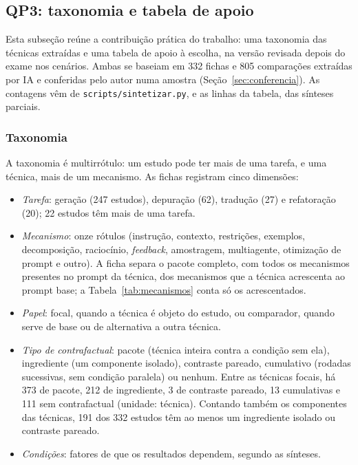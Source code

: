 \subsection{QP3: taxonomia e tabela de apoio}\label{sec:qp3}

Esta subseção reúne a contribuição prática do trabalho: uma taxonomia das técnicas
extraídas e uma tabela de apoio à escolha, na versão revisada depois do exame nos cenários. Ambas se baseiam em 332 fichas
e 805 comparações extraídas por IA e conferidas pelo autor numa amostra (Seção~\ref{sec:conferencia}). As contagens vêm de
\texttt{scripts/sintetizar.py}, e as linhas da tabela, das sínteses parciais.

\subsubsection{Taxonomia}

A taxonomia é multirrótulo: um estudo pode ter mais de uma tarefa, e uma técnica, mais
de um mecanismo. As fichas registram cinco dimensões:
\begin{itemize}
  \item \textit{Tarefa}: geração (247 estudos), depuração (62), tradução (27) e
    refatoração (20); 22 estudos têm mais de uma tarefa.
  \item \textit{Mecanismo}: onze rótulos (instrução, contexto, restrições, exemplos,
    decomposição, raciocínio, \textit{feedback}, amostragem, multiagente, otimização de prompt e
    outro). A ficha separa o pacote completo, com todos os mecanismos presentes no prompt
    da técnica, dos mecanismos que a técnica acrescenta ao prompt base; a
    Tabela~\ref{tab:mecanismos} conta só os acrescentados.
  \item \textit{Papel}: focal, quando a técnica é objeto do estudo, ou comparador, quando
    serve de base ou de alternativa a outra técnica.
  \item \textit{Tipo de contrafactual}: pacote (técnica inteira contra a condição sem
    ela), ingrediente (um componente isolado), contraste pareado, cumulativo (rodadas
    sucessivas, sem condição paralela) ou nenhum. Entre as técnicas focais, há 373 de
    pacote, 212 de ingrediente, 3 de contraste pareado, 13 cumulativas e 111 sem
    contrafactual (unidade: técnica). Contando também os componentes das técnicas, 191 dos
    332 estudos têm ao menos um ingrediente isolado ou contraste pareado.
  \item \textit{Condições}: fatores de que os resultados dependem, segundo as sínteses.
\end{itemize}

